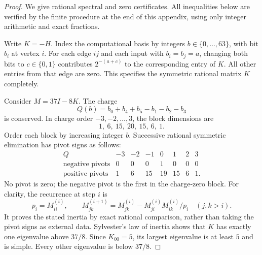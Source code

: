\documentclass[reqno]{amsart}
\theoremstyle{definition}
\theoremstyle{remark}
\begin{document}
\begin{proof}
We give rational spectral and zero certificates. All inequalities
below are verified by the finite procedure at the end of this
appendix, using only integer arithmetic and exact fractions.

Write $K=-H$. Index the computational basis by integers
$b\in\{0,\ldots,63\}$, with bit $b_i$ at vertex $i$.
For each edge $ij$ and each input with $b_i=b_j=a$, changing both
bits to $c\in\{0,1\}$ contributes $2^{-(a+c)}$ to the corresponding
entry of $K$. All other entries from that edge are zero.
This specifies the symmetric rational matrix $K$ completely.

Consider $M=37I-8K$. The charge
\[
 Q(b)=b_0+b_4+b_5-b_1-b_2-b_3
\]
is conserved. In charge order $-3,-2,\ldots,3$, the block dimensions are
\[
 1,\ 6,\ 15,\ 20,\ 15,\ 6,\ 1.
\]
Order each block by increasing integer $b$.
Successive rational symmetric elimination has pivot
signs as follows:
\[
\begin{array}{c|rrrrrrr}
 Q&-3&-2&-1&0&1&2&3\\ \hline
 \text{negative pivots}&0&0&0&1&0&0&0\\
 \text{positive pivots}&1&6&15&19&15&6&1.
\end{array}
\]
No pivot is zero; the negative pivot is the first in the charge-zero
block. For clarity, the recurrence at step $i$ is
\[
 p_i=M^{(i)}_{ii},\qquad
 M^{(i+1)}_{jk}
 =M^{(i)}_{jk}-M^{(i)}_{ji}M^{(i)}_{ik}/p_i
 \quad(j,k>i).
\]
It proves the stated inertia by exact rational comparison, rather
than taking the pivot signs as external data.
Sylvester's law of inertia shows that $K$ has exactly one
eigenvalue above $37/8$. Since $K_{00}=5$, its largest eigenvalue
is at least $5$ and is simple. Every other eigenvalue is below
$37/8$.


\end{proof}
\end{document}
